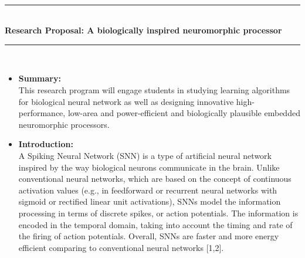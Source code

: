  \thispagestyle{empty}
 \phantom \quad \\
\hrule \phantom \quad  \vspace*{1\baselineskip}  \\
 {\bf Research Proposal: A biologically inspired neuromorphic processor}
 \vspace*{1\baselineskip}  \hrule \phantom \quad \\


\begin {itemize}

 \item [$\bullet$] { \bf Summary:} \vspace{0.5em} \\
This research program will engage  students in studying learning algorithms for biological neural network as well as designing innovative high-performance, low-area and power-efficient  and  biologically plausible embedded neuromorphic processors.

 \item [$\bullet$] { \bf Introduction:} \vspace{0.5em} \\
A Spiking Neural Network (SNN) is a type of artificial neural network inspired by the way biological neurons communicate in the brain. Unlike conventional neural networks, which are based on the concept of continuous activation values (e.g., in feedforward or recurrent neural networks with sigmoid or rectified linear unit activations), SNNs model the information processing in terms of discrete spikes, or action potentials. The information is encoded in the temporal domain,  taking into account the  timing and rate of the firing of action potentials. Overall, SNNs are faster and more energy efficient comparing to conventional neural networks [1,2].  




\end{itemize}
